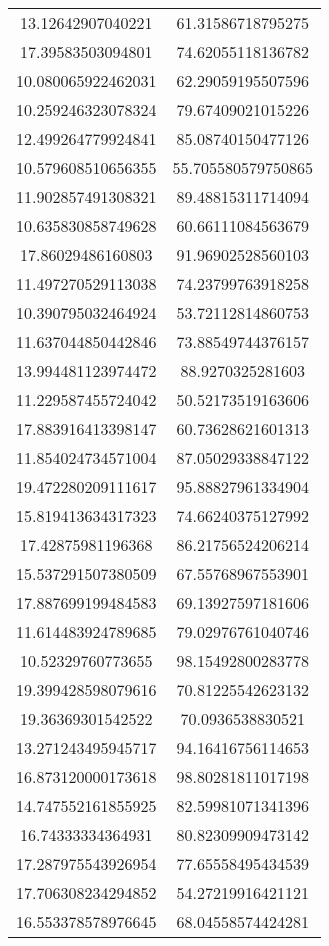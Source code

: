 \begin{table}
\begin{tabular}{cc}
13.12642907040221 & 61.31586718795275 \\
17.39583503094801 & 74.62055118136782 \\
10.080065922462031 & 62.29059195507596 \\
10.259246323078324 & 79.67409021015226 \\
12.499264779924841 & 85.08740150477126 \\
10.579608510656355 & 55.705580579750865 \\
11.902857491308321 & 89.48815311714094 \\
10.635830858749628 & 60.66111084563679 \\
17.86029486160803 & 91.96902528560103 \\
11.497270529113038 & 74.23799763918258 \\
10.390795032464924 & 53.72112814860753 \\
11.637044850442846 & 73.88549744376157 \\
13.994481123974472 & 88.9270325281603 \\
11.229587455724042 & 50.52173519163606 \\
17.883916413398147 & 60.73628621601313 \\
11.854024734571004 & 87.05029338847122 \\
19.472280209111617 & 95.88827961334904 \\
15.819413634317323 & 74.66240375127992 \\
17.42875981196368 & 86.21756524206214 \\
15.537291507380509 & 67.55768967553901 \\
17.887699199484583 & 69.13927597181606 \\
11.614483924789685 & 79.02976761040746 \\
10.52329760773655 & 98.15492800283778 \\
19.399428598079616 & 70.81225542623132 \\
19.36369301542522 & 70.0936538830521 \\
13.271243495945717 & 94.16416756114653 \\
16.873120000173618 & 98.80281811017198 \\
14.747552161855925 & 82.59981071341396 \\
16.74333334364931 & 80.82309909473142 \\
17.287975543926954 & 77.65558495434539 \\
17.706308234294852 & 54.27219916421121 \\
16.553378578976645 & 68.04558574424281 \\

\end{tabular}
\end{table}

